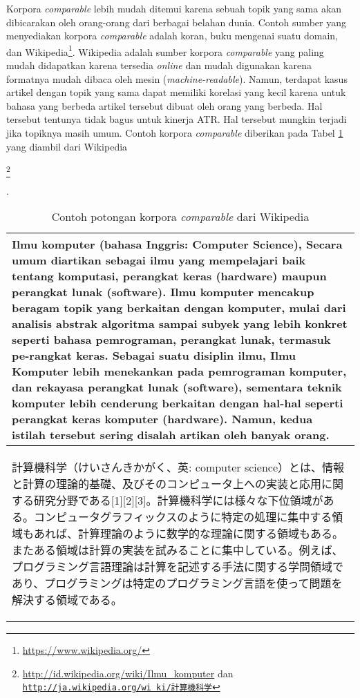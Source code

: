 \documentclass[../main/main.tex]{subfiles}
\begin{document}
Korpora \textit{comparable} lebih mudah ditemui karena sebuah topik yang sama akan dibicarakan oleh orang-orang dari berbagai belahan dunia. Contoh sumber yang menyediakan korpora \textit{comparable} adalah koran, buku mengenai suatu domain, dan Wikipedia\footnote{\url{https://www.wikipedia.org/}}. Wikipedia adalah sumber korpora \textit{comparable} yang paling mudah didapatkan karena tersedia \textit{online} dan mudah digunakan karena formatnya mudah dibaca oleh mesin (\textit{machine-readable}). Namun, terdapat kasus artikel dengan topik yang sama dapat memiliki korelasi yang kecil karena untuk bahasa yang berbeda artikel tersebut dibuat oleh orang yang berbeda. Hal tersebut tentunya tidak bagus untuk kinerja ATR. Hal tersebut mungkin terjadi jika topiknya masih umum. Contoh korpora \textit{comparable} diberikan pada Tabel \ref{tbl:studi_korpora_comparable} yang diambil dari Wikipedia\begin{CJK}{UTF8}{min}\footnote{\url{http://id.wikipedia.org/wiki/Ilmu_komputer} dan \href{http://ja.wikipedia.org/wiki/\%E8\%A8\%88\%E7\%AE\%97\%E6\%A9\%9F\%E7\%A7\%91\%E5\%AD\%A6}{\tt http://ja.wikipedia.org/wi ki/計算機科学}}\end{CJK}.

\begin{table}[htbp]
	\centering
	\caption{Contoh potongan korpora \textit{comparable} dari Wikipedia}
	\label{tbl:studi_korpora_comparable}
	\begin{tabular}{|p{\tablewidth}|}
		\hline
		Ilmu komputer (bahasa Inggris: Computer Science), Secara umum diartikan sebagai ilmu yang mempelajari baik tentang komputasi, perangkat keras (hardware) maupun perangkat lunak (software). Ilmu komputer mencakup beragam topik yang berkaitan dengan komputer, mulai dari analisis abstrak algoritma sampai subyek yang lebih konkret seperti bahasa pemrograman, perangkat lunak, termasuk pe-rangkat keras. Sebagai suatu disiplin ilmu, Ilmu Komputer lebih menekankan pada pemrograman komputer, dan rekayasa perangkat lunak (software), sementara teknik komputer lebih cenderung berkaitan dengan hal-hal seperti perangkat keras komputer (hardware). Namun, kedua istilah tersebut sering disalah artikan oleh banyak orang.\\ \hline
		\begin{CJK}{UTF8}{min}計算機科学（けいさんきかがく、英: computer science）とは、情報と計算の理論的基礎、及びそのコンピュータ上への実装と応用に関する研究分野である[1][2][3]。計算機科学には様々な下位領域がある。コンピュータグラフィックスのように特定の処理に集中する領域もあれば、計算理論のように数学的な理論に関する領域もある。またある領域は計算の実装を試みることに集中している。例えば、プログラミング言語理論は計算を記述する手法に関する学問領域であり、プログラミングは特定のプログラミング言語を使って問題を解決する領域である。
		\end{CJK}\\ \hline
	\end{tabular}
\end{table}
\end{document}
